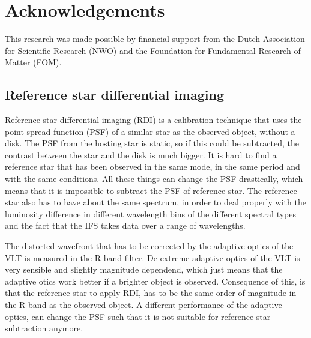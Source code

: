 \documentclass[twoside,single]{lion-msc}
\begin{document}
%

%

\section*{Acknowledgements}
This research was made possible by financial support from the Dutch Association for Scientific Research (NWO) and the Foundation for Fundamental Research of Matter (FOM).




\clearpage
\subsection*{Reference star differential imaging}
Reference star differential imaging (RDI) is a calibration technique that uses the point spread function (PSF) of a similar star as the observed object, without a disk. The PSF from the hosting star is static, so if this could be subtracted, the contrast between the star and the disk is much bigger. It is hard to find a reference star that has been observed in the same mode, in the same period and with the same conditions. All these things can change the PSF drastically, which means that it is impossible to subtract the PSF of reference star. The reference star also has to have about the same spectrum, in order to deal properly with the luminosity difference in different wavelength bins of the different spectral types and the fact that the IFS takes data over a range of wavelengths. 
\bigskip

The distorted wavefront that has to be corrected by the adaptive optics of the VLT is measured in the R-band filter. De extreme adaptive optics of the VLT is very sensible and slightly magnitude dependend, which just means that the adaptive otics work better if a brighter object is observed. Consequence of this, is that the reference star to apply RDI, has to be the same order of magnitude in the R band as the observed object. A different performance of the adaptive optics, can change the PSF such that it is not suitable for reference star subtraction anymore. 
\end{document}

